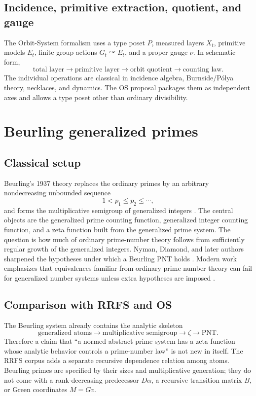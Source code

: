 \documentclass[11pt]{article}
\begin{document}
\subsection{Incidence, primitive extraction, quotient, and gauge}
The Orbit-System formalism uses a type poset $P$, measured layers $X_t$, primitive models $E_t$, finite group actions $G_t\curvearrowright E_t$, and a proper gauge $\nu$. In schematic form,
\[
 \text{total layer}\longrightarrow \text{primitive layer}\longrightarrow
 \text{orbit quotient}\longrightarrow\text{counting law}.
\]
The individual operations are classical in incidence algebra, Burnside/P\'olya theory, necklaces, and dynamics. The OS proposal packages them as independent axes and allows a type poset other than ordinary divisibility.

\section{Beurling generalized primes}
\subsection{Classical setup}
Beurling's 1937 theory replaces the ordinary primes by an arbitrary nondecreasing unbounded sequence
\[
 1<p_1\le p_2\le\cdots,
\]
and forms the multiplicative semigroup of generalized integers \cite{Beurling1937}. The central objects are the generalized prime counting function, generalized integer counting function, and a zeta function built from the generalized prime system. The question is how much of ordinary prime-number theory follows from sufficiently regular growth of the generalized integers. Nyman, Diamond, and later authors sharpened the hypotheses under which a Beurling PNT holds \cite{Nyman1949,Diamond1969,DiamondZhang2016}. Modern work emphasizes that equivalences familiar from ordinary prime number theory can fail for generalized number systems unless extra hypotheses are imposed \cite{DebruyneVindas2016}.

\subsection{Comparison with RRFS and OS}
The Beurling system already contains the analytic skeleton
\[
 \text{generalized atoms}\to\text{multiplicative semigroup}\to\zeta\to\text{PNT}.
\]
Therefore a claim that ``a normed abstract prime system has a zeta function whose analytic behavior controls a prime-number law'' is not new in itself. The RRFS corpus adds a separate recursive dependence relation among atoms. Beurling primes are specified by their sizes and multiplicative generation; they do not come with a rank-decreasing predecessor $D\alpha$, a recursive transition matrix $B$, or Green coordinates $M=Gv$.
\end{document}
